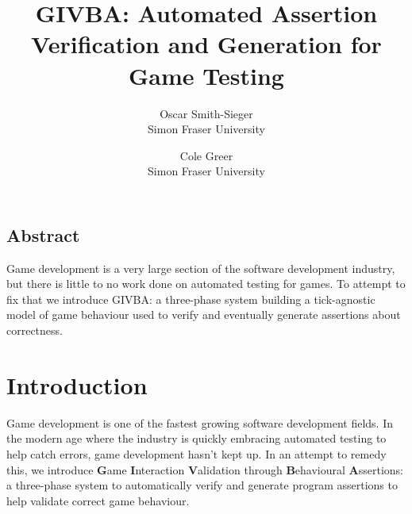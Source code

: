 \documentclass[letterpaper,twocolumn,10pt]{article}
\begin{document}
\date{}

\title{\Large \bf GIVBA: Automated Assertion Verification and Generation for Game Testing}

\author{
{\rm Oscar Smith-Sieger}\\
Simon Fraser University
\and
{\rm Cole Greer}\\
Simon Fraser University
} %

\maketitle

\thispagestyle{empty}


\subsection*{Abstract}

Game development is a very large section of the software development industry, but there is little to no work done on automated testing for games. To attempt to fix that we introduce GIVBA: a three-phase system building a tick-agnostic model of game behaviour used to verify and eventually generate assertions about correctness. \\

\section{Introduction}


Game development is one of the fastest growing software development fields. In the modern age where the industry is quickly embracing automated testing to help catch errors, game development hasn't kept up. In an attempt to remedy this, we introduce \textbf{G}ame \textbf{I}nteraction \textbf{V}alidation through \textbf{B}ehavioural \textbf{A}ssertions: a three-phase system to automatically verify and generate program assertions to help validate correct game behaviour.\\
\end{document}
